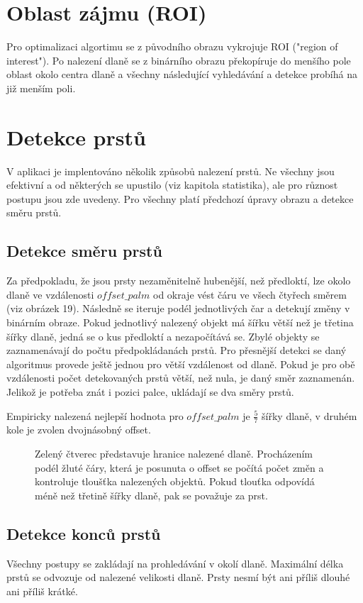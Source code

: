 \section{Oblast zájmu (ROI)}
Pro optimalizaci algortimu se z původního obrazu vykrojuje ROI ("region of interest"). Po nalezení dlaně se z binárního obrazu překopíruje do menšího pole oblast okolo centra dlaně a všechny následující vyhledávání a detekce probíhá na již menším poli. 


\section{Detekce prstů}
V aplikaci je implentováno několik způsobů nalezení prstů. Ne všechny jsou efektivní a od některých se upustilo (viz kapitola statistika), ale pro různost postupu jsou zde uvedeny. Pro všechny platí předchozí úpravy obrazu a detekce směru prstů.

\subsection{Detekce směru prstů}
Za předpokladu, že jsou prsty nezaměnitelně hubenější, než předloktí, lze okolo dlaně ve vzdálenosti $ offset\_palm $ od okraje vést čáru ve všech čtyřech směrem (viz obrázek 19). Následně se iteruje podél jednotlivých čar a detekují změny v binárním obraze. Pokud jednotlivý nalezený objekt má šířku větší než je třetina šířky dlaně, jedná se o kus předloktí a nezapočítává se. Zbylé objekty se zaznamenávají do počtu předpokládanách prstů.  Pro přesnější detekci se daný algoritmus provede ještě jednou pro větší vzdálenost od dlaně. Pokud je pro obě vzdálenosti počet detekovaných prstů větší, než nula, je daný směr zaznamenán. Jelikož je potřeba znát i pozici palce, ukládají se dva směry prstů.

Empiricky nalezená nejlepší hodnota pro $ offset\_palm $ je $ \frac{5}{7} $ šířky dlaně, v druhém kole je zvolen dvojnásobný offset. 

\begin{figure}[htp]
\centering
{}
\caption{Zelený čtverec představuje hranice nalezené dlaně. Procházením podél žluté čáry, která je posunuta o offset se počítá počet změn a kontroluje tloušťka nalezených objektů. Pokud tlouťka odpovídá méně než třetině šířky dlaně, pak se považuje za prst.}
\label{pic19}
\end{figure}
\newpage
\subsection{Detekce konců prstů}
Všechny postupy se zakládají na prohledávání v okolí dlaně. Maximální délka prstů se odvozuje od nalezené velikosti dlaně. Prsty nesmí být ani příliš dlouhé ani příliš krátké.\\


